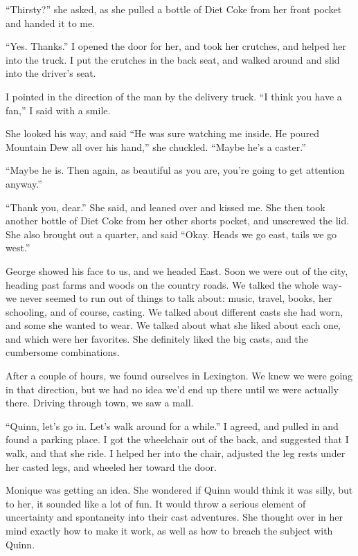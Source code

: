 ``Thirsty?'' she asked, as she pulled a bottle of Diet Coke from her front pocket and handed
it to me.

``Yes. Thanks.'' I opened the door for her, and took her crutches, and helped her into the
truck. I put the crutches in the back seat, and walked around and slid into the driver's seat.

I pointed in the direction of the man by the delivery truck. ``I think you have a fan,'' I
said with a smile.

She looked his way, and said ``He was sure watching me inside. He poured Mountain Dew all
over his hand,'' she chuckled. ``Maybe he's a caster.''

``Maybe he is. Then again, as beautiful as you are, you're going to get attention anyway.''

``Thank you, dear.'' She said, and leaned over and kissed me. She then took another bottle of
Diet Coke from her other shorts pocket, and unscrewed the lid. She also brought out a quarter,
and said ``Okay. Heads we go east, tails we go west.''

George showed his face to us, and we headed East. Soon we were out of the city, heading
past farms and woods on the country roads. We talked the whole way- we never seemed to run out
of things to talk about: music, travel, books, her schooling, and of course, casting. We talked
about different casts she had worn, and some she wanted to wear. We talked about what she liked
about each one, and which were her favorites. She definitely liked the big casts, and the
cumbersome combinations.

After a couple of hours, we found ourselves in Lexington. We knew we were going in that
direction, but we had no idea we'd end up there until we were actually there. Driving through
town, we saw a mall.

``Quinn, let's go in. Let's walk around for a while.'' I agreed, and pulled in and found a
parking place. I got the wheelchair out of the back, and suggested that I walk, and that she
ride. I helped her into the chair, adjusted the leg rests under her casted legs, and wheeled her
toward the door.

\begin{thought}
Monique was getting an idea. She wondered if Quinn would think it was silly, but to her, it
sounded like a lot of fun. It would throw a serious element of uncertainty and spontaneity into
their cast adventures. She thought over in her mind exactly how to make it work, as well as how
to breach the subject with Quinn.
\end{thought}

